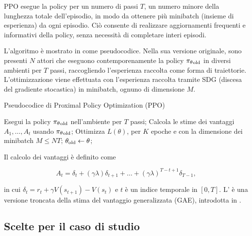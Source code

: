 PPO esegue la policy per un numero di passi $T$, un numero minore della lunghezza totale dell'episodio, in modo da ottenere più minibatch (insieme di esperienza) da ogni episodio. Ciò consente di realizzare aggiornamenti frequenti e informativi della policy, senza necessità di completare interi episodi.

L'algoritmo è mostrato in  come pseudocodice. Nella sua versione originale, sono presenti $N$ attori che eseguono contemporenamente la policy ${\pi_\theta}_\textnormal{old}$ in diversi ambienti per $T$ passi, raccogliendo l'esperienza raccolta come forma di traiettorie. L'ottimizzazione viene effettuata con l'esperienza raccolta tramite SDG (discesa del gradiente stocastica) in minibatch, ognuno di dimensione $M$.

\begin{algorithm}
    \caption[Pseudocodice di Proximal Policy Optimization (PPO)]{Pseudocodice di Proximal Policy Optimization (PPO)}
    \label{alg:2_ppo}
    \begin{algorithmic}[1] %
                \State Esegui la policy ${\pi_\theta}_\textnormal{old}$ nell'ambiente per $T$ passi;
                \State Calcola le stime dei vantaggi $A_1, \dots, A_t$ usando ${\pi_\theta}_\textnormal{old}$;
            \EndFor
            \State Ottimizza $L(\theta)$, per $K$ epoche e con la dimensione dei minibatch $M \le NT$;
            \State $\theta_\textnormal{old} \gets \theta$;
        \EndFor
    \end{algorithmic}
\end{algorithm}

Il calcolo dei vantaggi è definito come

\begin{equation}\label{eq:2_ppo_advantages}
    A_t = \delta_t + (\gamma \lambda) \delta_{t+1} + \dots + (\gamma \lambda)^{T-t+1} \delta_{T-1},
\end{equation}

in cui $\delta_t = r_t + \gamma V(s_{t+1}) - V(s_t)$ e $t$ è un indice temporale in $[0, T]$. L' è una versione troncata della stima del vantaggio generalizzata (GAE), introdotta in \cite{Schulman2015}.

\subsection{Scelte per il caso di studio}
\label{sec:2_rl_ppo_choices}

